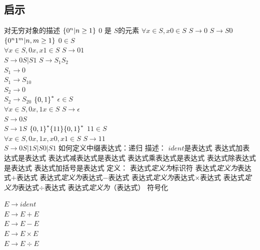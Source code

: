 \documentclass{ctexart}
\DeclarePairedDelimiter{\set}{\{}{\}}
\begin{document}
\subsection{启示}
\begin{outline}
    \1 对无穷对象的描述
        \2 $\set*{0^n | n \geq 1}$
            \3 $0$ 是 $S$的元素
            \3 $\forall x \in S, x0 \in S$
            \3 $S \to 0$
            \3 $S \to S0$
        \2 $\set*{0^n1^m | n, m \geq 1}$
            \3 $0 \in S$ \\
               $\forall x \in S, 0x, x1 \in S$
            \3 $S \to 01$ \\
               $S \to 0S | S1$
            \3 $S \to S_1S_2$ \\
               $S_1 \to 0$ \\
               $S_1 \to S_10$ \\
               $S_2 \to 0$ \\
               $S_2 \to S_20$
        \2 $\set*{0,1}^*$
            \3 $\epsilon \in S$ \\
               $\forall x \in S, 0x, 1x \in S$
            \3 $S \to \epsilon$ \\
               $S \to 0S $\\
               $S \to 1S $
        \2 $\set*{0,1}^*\set*{11}\set*{0,1}^*$
            \3 $11 \in S$ \\
               $\forall x \in S, 0x, 1x, x0, x1 \in S$
            \3 $S \to 11$ \\
               $S \to 0S | 1S | S0 | S1$
    \1 如何定义中缀表达式：递归
        \2 描述：
            \3 $ident$是表达式
            \3 表达式加表达式是表达式
            \3 表达式减表达式是表达式
            \3 表达式乘表达式是表达式
            \3 表达式除表达式是表达式
            \3 表达式加括号是表达式
        \2 定义：
            \3 表达式\emph{定义为}标识符
            \3 表达式\emph{定义为}表达式$+$表达式
            \3 表达式\emph{定义为}表达式$-$表达式
            \3 表达式\emph{定义为}表达式$\times$表达式
            \3 表达式\emph{定义为}表达式$\div$表达式
            \3 表达式\emph{定义为}（表达式）
        \2 符号化 \par
               $E \to ident$ \\
               $E \to E + E$ \\
               $E \to E - E$ \\
               $E \to E \times E$ \\
               $E \to E \div E$ \\

\end{outline}
\end{document}
